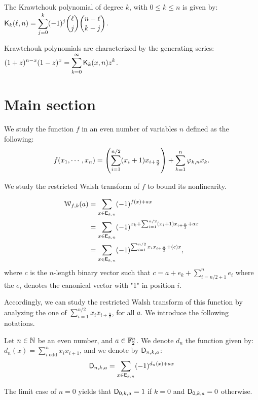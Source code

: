 \documentclass[11pt]{llncs}
\begin{document}
\begin{definition}\label{def:Kraw}
	The Krawtchouk polynomial of degree $k$, with $0\leq k\leq n$ is given by: $ \displaystyle \mathsf{K}_{k}(\ell,n)=\sum_{j=0}^{k} (-1)^j \binom{\ell}{j} \binom{n-\ell}{k-j}$. 
	
	Krawtchouk polynomials are characterized by the generating series: $ \displaystyle (1+z)^{n-x} (1-z)^x=\sum_{k=0}^\infty \mathsf{K}_{k}(x,n) z^k$.
\end{definition}










\section{Main section}

We study the function $f$ in an even number of variables $n$ defined as the following:
\[f(x_1,\cdots,x_n)=\left(\sum_{i=1}^{n/2} (x_i+1) x_{i+\frac{n}{2}}\right) + \sum_{k=1}^n \varphi_{k,n} x_k.\]

We study the restricted Walsh transform  of $f$ to bound its nonlinearity.

\begin{align*}
\mathcal{W}_{f,k}(a)&=\sum_{x \in \mathsf{E}_{k,n}} (-1)^{f(x)+ax}\\
&=\sum_{x \in \mathsf{E}_{k,n}} (-1)^{x_k + \sum_{i=1}^{n/2} (x_i+1) x_{i+\frac{n}{2}}+ ax}\\
&=\sum_{x \in \mathsf{E}_{k,n}} (-1)^{\sum_{i=1}^{n/2} x_i x_{i+\frac{n}{2}}+ (c)x},
\end{align*}
where $c$ is the $n$-length binary vector such that $c=a+e_k+\sum_{i=n/2+1}^n e_i$ where the $e_i$ denotes the canonical vector with "1" in position $i$.

Accordingly, we can study the restricted Walsh transform of this function by analyzing the one of $\sum_{i=1}^{n/2} x_i x_{i+\frac{n}{2}}$, for all $a$. We introduce the following notations.

\begin{definition}
Let $n\in \mathbb{N}$ be an even number, and $a\in \mathbb{F}_2^n$. We denote $d_n$ the function given by: $d_n(x)=\sum_{i \text{ odd}}^n x_i x_{i+1}$, 
and we denote by $\mathsf{D}_{n,k,a}$:
\[\mathsf{D}_{n,k,a}= \sum_{x\in \mathsf{E}_{k,n}} (-1)^{d_n(x) +a x}\]
\end{definition}
The limit case of $n=0$ yields that $\mathsf{D}_{0,k,a}=1$ if $k=0$ and $\mathsf{D}_{0,k,a}=0$ otherwise.
\end{document}
